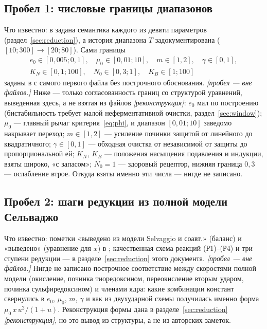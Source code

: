 \documentclass[11pt,a4paper]{article}
\theoremstyle{remark}
\newcommand{\code}[1]{\texttt{\detokenize{#1}}}
\begin{document}
\subsection{Пробел 1: числовые границы диапазонов}
\label{sec:gap1}
Что известно: в \code{core_model.py} задана семантика каждого из девяти параметров
(раздел~\ref{sec:reduction}), а история диапазона $T$ задокументирована
($[10;300]\to[20;80]$). Сами границы
\begin{equation*}
\begin{gathered}
e_0\in[0{,}005;0{,}1],\quad \mu_0\in[0{,}01;10],\quad m\in[1,2],\quad
\gamma\in[0,1],\\
K_N\in[0{,}1;100],\quad N_0\in[0{,}3;1],\quad K_B\in[1;100]
\end{gathered}
\end{equation*}
заданы в \code{RANGES} с самого первого файла без построчного обоснования.
\emph{[пробел --- вне файлов.]} Ниже --- только согласованность границ со структурой
уравнений, выведенная здесь, а не взятая из файлов \emph{[реконструкция]}: $e_0$ мал по
построению (бистабильность требует малой неферментативной очистки,
раздел~\ref{sec:window}); $\mu_0$ --- главный рычаг критерия~\eqref{eq:phi}, и
диапазон $[0{,}01;10]$ заведомо накрывает переход; $m\in[1,2]$ --- усиление починки
защитой от линейного до квадратичного; $\gamma\in[0,1]$ --- обходная очистка от
независимой от защиты до пропорциональной ей; $K_N$, $K_B$ --- положения насыщения
подавления и индукции, взяты широко, «с запасом»; $N_0=1$ --- здоровый рецептор,
нижняя граница $0{,}3$ --- ослабление втрое. Откуда взяты именно эти числа --- нигде не
записано.

\subsection{Пробел 2: шаги редукции из полной модели Сельваджо}
\label{sec:gap2}
Что известно: пометки «выведено из модели Selvaggio и соавт.» (баланс) и «выведено»
(уравнение для $x$) в \code{core_model.py}; качественная схема реакций (Р1)--(Р4) и
три ступени редукции --- в разделе~\ref{sec:reduction} этого документа.
\emph{[пробел --- вне файлов.]} Нигде не записано построчное соответствие между
скоростями полной модели (окисление, починка тиоредоксином, переокисление вторым
ударом, починка сульфиредоксином) и членами ядра: какие комбинации констант свернулись
в $e_0$, $\mu_0$, $m$, $\gamma$ и как из двухударной схемы получилась именно форма
$\mu_0\,x\,u^2/(1+u)$. Реконструкция формы дана в разделе~\ref{sec:reduction}
\emph{[реконструкция]}, но это вывод из структуры, а не из авторских заметок.
\end{document}
